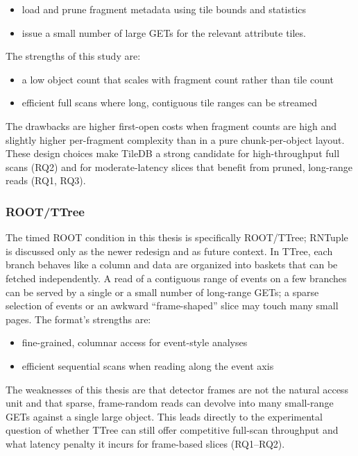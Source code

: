\documentclass[nomenclature, english, bibtex]{kththesis}
\numberwithin{listing}{chapter}
\begin{document}
\begin{itemize}
    \item load and prune fragment metadata using tile bounds and statistics
    \item issue a small number of large GETs for the relevant attribute tiles.
\end{itemize}

The strengths of this study are:

\begin{itemize}
    \item a low object count that scales with fragment count rather than tile count
    \item efficient full scans where long, contiguous tile ranges can be streamed
\end{itemize}

The drawbacks are higher first-open costs when fragment counts are high and slightly higher per-fragment complexity than in a pure chunk-per-object layout. These design choices make TileDB a strong candidate for high-throughput full scans (RQ2) and for moderate-latency slices that benefit from pruned, long-range reads (RQ1, RQ3).

\subsubsection{\texorpdfstring{\gls{ROOT}/\gls{TTree}}{ROOT/TTree}}
The timed \gls{ROOT} condition in this thesis is specifically \gls{ROOT}/\gls{TTree}; \gls{RNTuple} is discussed only as the newer redesign and as future context. In \gls{TTree}, each branch behaves like a column and data are organized into baskets that can be fetched independently. A read of a contiguous range of events on a few branches can be served by a single or a small number of long-range GETs; a sparse selection of events or an awkward “frame-shaped” slice may touch many small pages. The format’s strengths are:

\begin{itemize}
    \item fine-grained, columnar access for event-style analyses
    \item efficient sequential scans when reading along the event axis
\end{itemize}

The weaknesses of this thesis are that detector frames are not the natural access unit and that sparse, frame-random reads can devolve into many small-range GETs against a single large object. This leads directly to the experimental question of whether \gls{TTree} can still offer competitive full-scan throughput and what latency penalty it incurs for frame-based slices (RQ1–RQ2).
\end{document}
